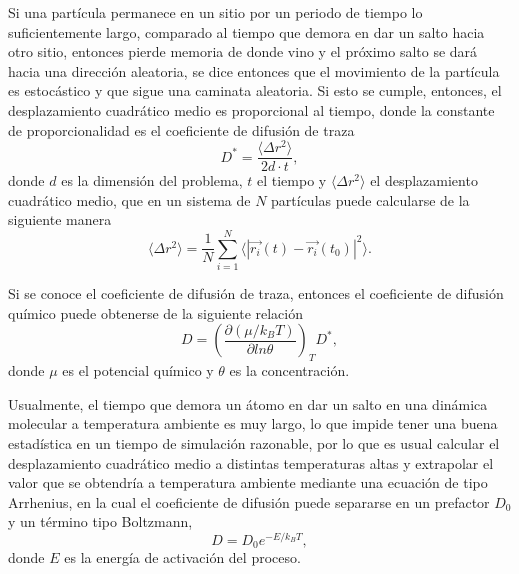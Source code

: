 Si una partícula permanece en un sitio por un periodo de tiempo lo 
suficientemente largo, comparado al tiempo que demora en dar un salto hacia otro
sitio, entonces pierde memoria de donde vino y el próximo salto se dará hacia 
una dirección aleatoria, se dice entonces que el movimiento de la partícula es 
estocástico y que sigue una caminata aleatoria. Si esto se cumple, entonces, el 
desplazamiento cuadrático medio es proporcional al tiempo, donde la constante de 
proporcionalidad es el coeficiente de difusión de traza
\begin{equation}
    D^{*} = \frac{\langle \Delta r^2 \rangle}{2d\cdot t},
\end{equation}
donde $d$ es la dimensión del problema, $t$ el tiempo y 
$\langle \Delta r^2 \rangle$ el desplazamiento cuadrático medio, que en un 
sistema de $N$ partículas puede calcularse de la siguiente manera
\begin{equation}
    \langle \Delta r^2 \rangle = \frac{1}{N} \sum_{i=1}^{N} \langle |\vec{r_i}(t) - \vec{r_i}(t_0)|^2 \rangle.
\end{equation}

Si se conoce el coeficiente de difusión de traza, entonces el coeficiente de 
difusión químico puede obtenerse de la siguiente relación ~\cite{gomer1990}
\begin{equation}
    D = \left( \frac{\partial (\mu / k_BT)}{\partial ln \theta} \right)_T D^{*},
\end{equation}
donde $\mu$ es el potencial químico y $\theta$ es la concentración.

Usualmente, el tiempo que demora un átomo en dar un salto en una dinámica 
molecular a temperatura ambiente es muy largo, lo que impide tener una buena 
estadística en un tiempo de simulación razonable, por lo que es usual calcular 
el desplazamiento cuadrático medio a distintas temperaturas altas y extrapolar
el valor que se obtendría a temperatura ambiente mediante una ecuación de tipo 
Arrhenius, en la cual el coeficiente de difusión puede separarse en un 
prefactor $D_0$ y un término tipo Boltzmann,
\begin{equation}
    D = D_0 e^{-E / k_BT},
\end{equation}
donde $E$ es la energía de activación del proceso. 
